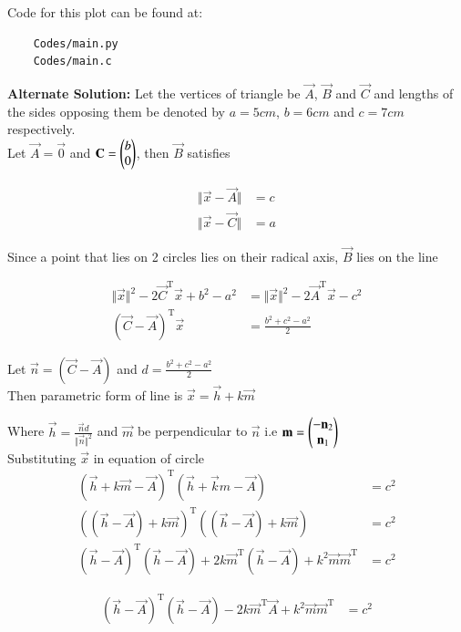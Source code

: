 \documentclass[journal]{IEEEtran}
\begin{document}
Code for this plot can be found at:
\begin{lstlisting}
    Codes/main.py
    Codes/main.c
\end{lstlisting}

\textbf{Alternate Solution: } Let the vertices of triangle be $\vec{A}$, $\vec{B}$ and $\vec{C}$ and lengths of the sides opposing them be denoted by $a = 5cm$, $b = 6cm$ and $c = 7cm$ respectively.
\\

Let $\vec{A} = \vec{0}$ and $\mathbf{C} = \begin{pmatrix}b \\ 0\end{pmatrix}$, then $\vec{B}$ satisfies

\begin{align*}
	\Vert \vec{x} - \vec{A} \Vert &= c\\
	\Vert \vec{x} - \vec{C} \Vert &= a
\end{align*}

Since a point that lies on 2 circles lies on their radical axis, $\vec{B}$ lies on the line

\begin{align*}
	\Vert \vec{x}\Vert^2 - 2\vec{C}^\text{T}\vec{x} + b^2 - a^2 &= \Vert \vec{x}\Vert^2 - 2\vec{A}^\text{T}\vec{x} - c^2 \\
	(\vec{C}-\vec{A})^\text{T}\vec{x} &= \frac{b^2 + c^2 - a^2}{2}
\end{align*}

Let $\vec{n} = (\vec{C} - \vec{A})$ and $d = \frac{b^2 + c^2 - a^2}{2}$
\\

Then parametric form of line is $\vec{x} = \vec{h} + k\vec{m}$

Where $\vec{h} = \frac{\vec{n}d}{\Vert \vec{n} \Vert^2}$ and $\vec{m}$ be perpendicular to $\vec{n}$ i.e $\mathbf{m} = \begin{pmatrix}-\mathbf{n}_2 \\ \mathbf{n}_1\end{pmatrix}$
\\

Substituting $\vec{x}$ in equation of circle
\begin{align*}
	(\vec{h} + k\vec{m} - \vec{A})^\text{T} (\vec{h} + \vec{k}m - \vec{A}) &= c^2\\
	((\vec{h} - \vec{A}) + k\vec{m})^\text{T} ((\vec{h} - \vec{A}) + k\vec{m}) &= c^2\\
	(\vec{h} - \vec{A})^\text{T}(\vec{h} - \vec{A}) + 2k\vec{m}^\text{T}(\vec{h} - \vec{A}) + k^2\vec{m}\vec{m}^\text{T} &= c^2
\end{align*}

\begin{align*}
	(\vec{h} - \vec{A})^\text{T}(\vec{h} - \vec{A}) - 2k\vec{m}^\text{T}\vec{A} + k^2\vec{m}\vec{m}^\text{T} &= c^2	
\end{align*}
\end{document}
